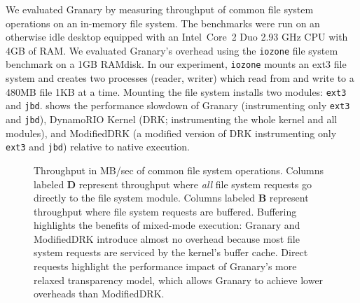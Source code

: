 \documentclass[preprint]{sigplanconf}
\begin{document}
We evaluated Granary by measuring throughput of common file system operations on an in-memory file system. The benchmarks were run on an otherwise idle desktop equipped with an Intel\textregistered\ Core\texttrademark\ 2 Duo 2.93 GHz CPU with 4GB of RAM. We evaluated Granary's overhead using the \texttt{iozone} file system benchmark on a 1GB RAMdisk. In our experiment, \texttt{iozone} mounts an ext3 file system and creates two processes (reader, writer) which read from and write to a 480MB file 1KB at a time. Mounting the file system installs two modules: \texttt{ext3} and \texttt{jbd}.  shows the performance slowdown of Granary (instrumenting only \texttt{ext3} and \texttt{jbd}), DynamoRIO Kernel (DRK; instrumenting the whole kernel and all modules), and ModifiedDRK (a modified version of DRK instrumenting only \texttt{ext3} and \texttt{jbd}) relative to native execution.

\begin{figure}[t!]
\caption{\label{fig:perf}Throughput in MB/sec of common file system operations. Columns labeled {\bf D} represent throughput where \emph{all} file system requests go directly to the file system module. Columns labeled {\bf B} represent throughput where file system requests are buffered. Buffering highlights the benefits of mixed-mode execution: Granary and ModifiedDRK introduce almost no overhead because most file system requests are serviced by the kernel's buffer cache. Direct requests highlight the performance impact of Granary's more relaxed transparency model, which allows Granary to achieve lower overheads than ModifiedDRK.}
\end{figure}






\end{document}
